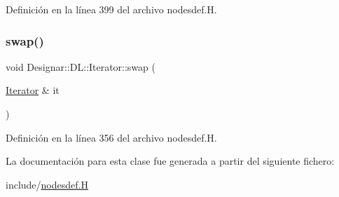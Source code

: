 Definición en la línea 399 del archivo nodesdef.\+H.

\mbox{\label{class_designar_1_1_d_l_1_1_iterator_af8bba1d661f8d6300664481d7c6fd976}} 
\subsubsection{\texorpdfstring{swap()}{swap()}}
{\footnotesize\ttfamily void Designar\+::\+D\+L\+::\+Iterator\+::swap (\begin{DoxyParamCaption}\item[{\hyperlink{class_designar_1_1_d_l_1_1_iterator}{Iterator} \&}]{it }\end{DoxyParamCaption})\hspace{0.3cm}{\ttfamily [inline]}}



Definición en la línea 356 del archivo nodesdef.\+H.



La documentación para esta clase fue generada a partir del siguiente fichero\+:\begin{DoxyCompactItemize}
\item 
include/\hyperlink{nodesdef_8_h}{nodesdef.\+H}\end{DoxyCompactItemize}
